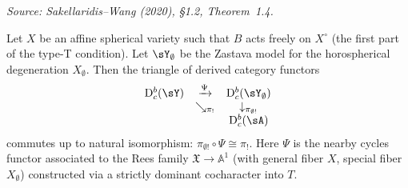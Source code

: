 \begin{theorem}
  \label{thm:nearby-asymptotics}
  \textit{Source: Sakellaridis--Wang (2020), §1.2, Theorem~1.4.}

  Let \( X \) be an affine spherical variety such that \( B \) acts freely on \( X^\circ \)
  (the first part of the type-T condition).
  Let \( \sY_\emptyset \) be the Zastava model for the horospherical degeneration
  \( X_\emptyset \).
  Then the triangle of derived category functors
  \[
    \begin{array}{ccc}
      \mathrm{D}^b_c(\sY) & \xrightarrow{\Psi} & \mathrm{D}^b_c(\sY_\emptyset) \\
      & \searrow_{\pi_!} & \downarrow_{\pi_{\emptyset!}} \\
      & & \mathrm{D}^b_c(\sA)
    \end{array}
  \]
  commutes up to natural isomorphism:
  \( \pi_{\emptyset!} \circ \Psi \cong \pi_! \).
  Here \( \Psi \) is the nearby cycles functor associated to the Rees family
  \( \mathfrak{X} \to \mathbb{A}^1 \) (with general fiber \( X \), special fiber
  \( X_\emptyset \)) constructed via a strictly dominant cocharacter into \( T \).
\end{theorem}

